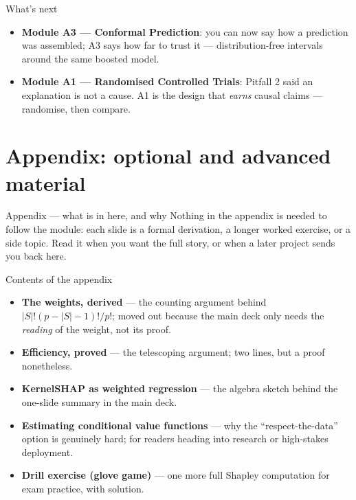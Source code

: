 \documentclass[aspectratio=169,11pt]{beamer}
\begin{document}
\begin{frame}{What's next}
  \begin{itemize}
    \item \textbf{Module A3 --- Conformal Prediction}: you can now say how a
          prediction was assembled; A3 says how far to trust it ---
          distribution-free intervals around the same boosted model.
    \item \textbf{Module A1 --- Randomised Controlled Trials}: Pitfall 2 said an
          explanation is not a cause. A1 is the design that \emph{earns} causal
          claims --- randomise, then compare.
  \end{itemize}
\end{frame}


\appendix
\AtBeginSection[]{}
\section{Appendix: optional and advanced material}

\begin{frame}{Appendix --- what is in here, and why}
  \small
  Nothing in the appendix is needed to follow the module: each slide is a
  formal derivation, a longer worked exercise, or a side topic. Read it when
  you want the full story, or when a later project sends you back here.
  \begin{block}{Contents of the appendix}
    \begin{itemize}
      \item \textbf{The weights, derived} --- the counting argument behind
            $|S|!(p-|S|-1)!/p!$; moved out because the main deck only needs the
            \emph{reading} of the weight, not its proof.
      \item \textbf{Efficiency, proved} --- the telescoping argument; two lines,
            but a proof nonetheless.
      \item \textbf{KernelSHAP as weighted regression} --- the algebra sketch
            behind the one-slide summary in the main deck.
      \item \textbf{Estimating conditional value functions} --- why the
            ``respect-the-data'' option is genuinely hard; for readers heading
            into research or high-stakes deployment.
      \item \textbf{Drill exercise (glove game)} --- one more full Shapley
            computation for exam practice, with solution.
    \end{itemize}
  \end{block}
\end{frame}
\end{document}
